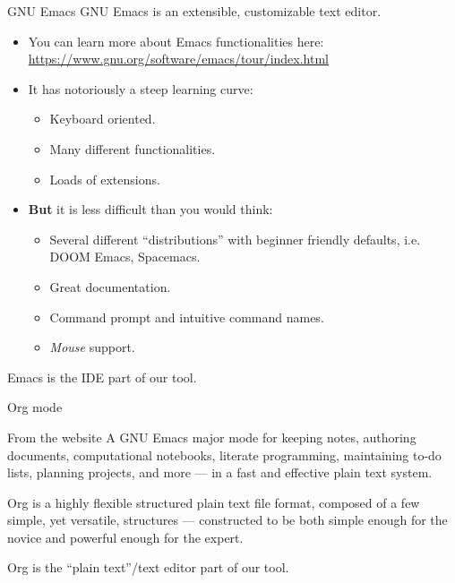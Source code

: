 \documentclass{Gesue_PresentationTemplate}
\begin{document}
\begin{frame}{GNU Emacs}
  GNU Emacs is an extensible,
  customizable text editor.
  \begin{itemize}\small
    \item You can learn more about Emacs
          functionalities here:
          \url{https://www.gnu.org/software/emacs/tour/index.html}
    \item It has notoriously a
          \alert{steep learning curve}:
          \begin{itemize}
            \item Keyboard oriented.
            \item Many different functionalities.
            \item Loads of extensions.
          \end{itemize}
    \item \textbf{But} it is
          \alert{less difficult} than
          you would think:
          \begin{itemize}
            \item Several different
                  ``distributions'' with beginner
                  friendly defaults, i.e.
                  DOOM Emacs\cite{doomemacs},
                  Spacemacs\cite{spacemacs}.
            \item Great documentation.
            \item Command prompt and intuitive
                  command names.
            \item \textit{Mouse} support.
          \end{itemize}
  \end{itemize}
  \vspace{-0.5em}
\begin{exampleblock}{}\small
Emacs is the IDE part of our tool.
\end{exampleblock}
\end{frame}
\begin{frame}{Org mode}
  \begin{block}{From the website}
A GNU Emacs major mode for keeping notes, authoring documents, computational notebooks, literate programming, maintaining to-do lists, planning projects, and more — in a fast and effective plain text system.
\vspace{1 em}

  Org is a highly flexible structured plain text file format, composed of a few simple, yet versatile, structures — constructed to be both simple enough for the novice and powerful enough for the expert.
\end{block}
\begin{exampleblock}{}
  Org is the ``plain text''/text editor
  part of our tool.
\end{exampleblock}
\end{frame}
\end{document}
